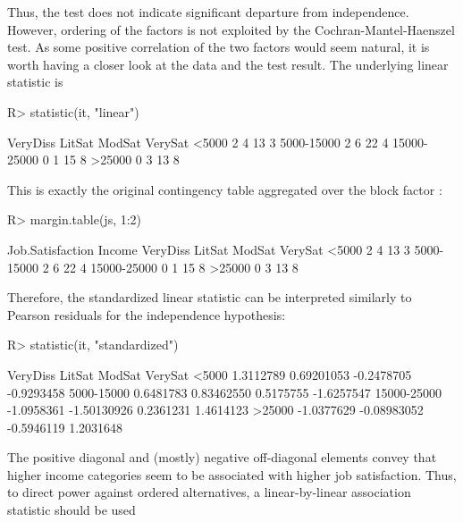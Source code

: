 \documentclass[article]{jss}
\begin{document}
Thus, the test does not indicate significant departure from independence.
However, ordering of the factors is not exploited by the Cochran-Mantel-Haenszel test.
As some positive correlation of the two factors would seem natural, it is worth
having a closer look at the data and the test result. The underlying linear statistic is
\begin{Schunk}
\begin{Sinput}
R> statistic(it, "linear")
\end{Sinput}
\begin{Soutput}
            VeryDiss LitSat ModSat VerySat
<5000              2      4     13       3
5000-15000         2      6     22       4
15000-25000        0      1     15       8
>25000             0      3     13       8
\end{Soutput}
\end{Schunk}
This is exactly the original contingency table
aggregated over the block factor :
\begin{Schunk}
\begin{Sinput}
R> margin.table(js, 1:2)
\end{Sinput}
\begin{Soutput}
             Job.Satisfaction
Income        VeryDiss LitSat ModSat VerySat
  <5000              2      4     13       3
  5000-15000         2      6     22       4
  15000-25000        0      1     15       8
  >25000             0      3     13       8
\end{Soutput}
\end{Schunk}
Therefore, the standardized linear statistic can be interpreted similarly
to Pearson residuals for the independence hypothesis:
\begin{Schunk}
\begin{Sinput}
R> statistic(it, "standardized")
\end{Sinput}
\begin{Soutput}
              VeryDiss      LitSat     ModSat    VerySat
<5000        1.3112789  0.69201053 -0.2478705 -0.9293458
5000-15000   0.6481783  0.83462550  0.5175755 -1.6257547
15000-25000 -1.0958361 -1.50130926  0.2361231  1.4614123
>25000      -1.0377629 -0.08983052 -0.5946119  1.2031648
\end{Soutput}
\end{Schunk}
The positive diagonal and (mostly) negative off-diagonal elements convey
that higher income categories seem to be associated with higher job
satisfaction. Thus, to direct power against ordered alternatives,
a linear-by-linear association statistic \citep{agresti2002} should be used
\end{document}
